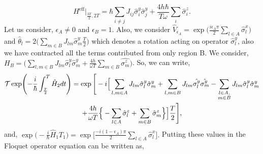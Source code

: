 \documentclass[%
reprint,
superscriptaddress,
amsmath,amssymb,showkeys,
aps,
prb,
]{revtex4-2}
\begin{document}
	\begin{equation}
		H^{\mathrm{eff}}\vert_{\frac{3T}{2}, 2T} = \hbar\sum_{i\neq j} J_{ij} \hat{\sigma}^y_i \hat{\sigma}^y_{j} + \frac{4h\hbar}{T \omega}\sum_i\hat{\sigma}^z_i.
	\end{equation} 
	Let us consider, $\epsilon_A \neq 0$ and $\epsilon_B=1$. Also, we consider $\displaystyle \hat{V}_{\epsilon_A} = \exp\Big(\frac{i\epsilon_A \pi}{2}\sum_{l\in A}\hat{\sigma}^x_l\Big)$  and $\displaystyle \hat{\theta}_l = 2 \Big(\sum_{m \in B}J_{lm}\hat{\sigma}^y_m \frac{T}{2} \Big)$ which denotes a rotation acting on operator $\hat{\sigma}^y_l$, also we have contracted all the terms contributed from only region B. We consider, $\displaystyle {H}_B = \Big(\sum_{l,m\in B} J_{lm} \hat{\sigma}^y_l\hat{\sigma}^y_m + \frac{4h}{\omega T}\sum_{m \in B}\hat{\sigma^z_m}\Big)$. So, we can write,		
	\begin{multline}
		\mathcal{T}\exp(-\frac{i}{\hbar}\int_{\frac{T}{2}}^{T} \hat{H}_2 dt) = \exp\Bigg[-i \Big[ \sum_{l,m\in A}J_{lm} \hat{\sigma}_l^y\hat{\sigma}_m^y +\sum_{l,m\in B}J_{lm}
		\hat{\sigma_l^y}\hat{\sigma_m^y}-\sum_{\substack{%
				l \in A,\\
				m \in B\hfill}} J_{lm}\hat{\sigma}^y_l\hat{\sigma}^y_m\\+\frac{4h}{\omega T}\Big\{ -\sum_{l\in A}^{}\hat{\sigma}^z_l + \sum_{m\in B}^{}\hat{\sigma}^z_m\Big\}\Big]\frac{T}{2}\Bigg],
	\end{multline}	
	and, $\displaystyle 
	\exp\Big(-\frac{i}{\hbar} \hat{H}_1 T_1\Big) = \exp\Bigg[\frac{-i(1-\epsilon_A)\pi}{2}\sum_{l \in A}\hat{\sigma}^x_l\Bigg].$
	Putting these values in the Floquet operator equation can be written as,    	
\end{document}
